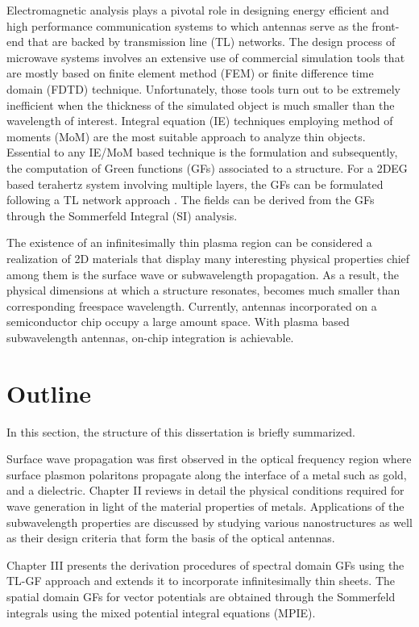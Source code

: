 Electromagnetic analysis plays a pivotal role in designing energy efficient and high performance communication systems to which antennas serve as the front-end that are backed by transmission line (TL) networks. The design process of microwave systems involves an extensive use of commercial simulation tools that are mostly based on finite element method (FEM) or finite difference time domain (FDTD) technique. Unfortunately, those tools turn out to be extremely inefficient when the thickness of the simulated object is much smaller than the wavelength of interest. Integral equation (IE) techniques employing method of moments (MoM) are the most suitable approach to analyze thin objects. Essential to any IE/MoM based technique is the formulation and subsequently, the computation of Green functions (GFs) associated to a structure. For a 2DEG based terahertz system involving multiple layers, the GFs can be formulated following a TL network approach \cite{Michalski1997}. The fields can be derived from the GFs through the Sommerfeld Integral (SI) analysis.

The existence of an infinitesimally thin plasma region can be considered a realization of 2D materials that display many interesting physical properties chief among them is the surface wave or subwavelength propagation. As a result, the physical dimensions at which a structure resonates, becomes much smaller than corresponding freespace wavelength. Currently, antennas incorporated on a semiconductor chip occupy a large amount space. With plasma based subwavelength antennas, on-chip integration is achievable.
\section*{Outline}
%
In this section, the structure of this dissertation is briefly summarized.

Surface wave propagation was first observed in the optical frequency region where surface plasmon polaritons propagate along the interface of a metal such as gold, and a dielectric. Chapter II reviews in detail the physical conditions required for wave generation in light of the material properties of metals. Applications of the subwavelength properties are discussed by studying various nanostructures as well as their design criteria that form the basis of the optical antennas.

Chapter III presents the derivation procedures of spectral domain GFs using the TL-GF approach \cite{Michalski1997,Michalski2005} and extends it to incorporate infinitesimally thin sheets. The spatial domain GFs for vector potentials are obtained through the Sommerfeld integrals using the mixed potential integral equations (MPIE).


